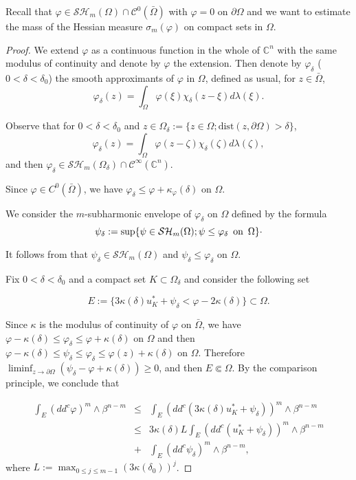 \documentclass[12pt]{amsart}
\theoremstyle{definition}
\numberwithin{theorem}{section}
\numberwithin{equation}{section}
\newcommand{\C}{\mathbb{C}}
\begin{document}
{ Recall that $\varphi \in \mathcal{SH}_m (\Omega)  \cap \mathcal{C}^0 (\bar{\Omega})$ with $\varphi = 0$ on $\partial \Omega$ and we want to estimate the mass of the Hessian measure $\sigma_m (\varphi)$ on compact sets in $\Omega$.
 \begin{proof} 
We extend $\varphi$ as a continuous function in the whole of $\C^n$ with the same modulus of continuity and denote by $\varphi$ the extension.
 Then denote by $\varphi_{\delta}$ ($0 < \delta < \delta_0$) the smooth approximants of $\varphi $ in $\Omega$, defined as usual, for $z \in \bar \Omega$, 
   $$
    \varphi_{\delta}(z)=  \int_{\Omega}\varphi(\xi)\chi_{\delta}(z-\xi) d\lambda(\xi).
    $$

 Observe that for $0 < \delta < \delta_0$ and $z\in\Omega_{\delta}  := \{z \in \Omega ; \mathrm{dist} (z, \partial \Omega) > \delta\}$, 
     $$
     \varphi_{\delta}(z)=  \int_{\Omega}\varphi(z - \zeta)\chi_{\delta}(\zeta) d\lambda(\zeta),
     $$
  and then $\varphi_\delta \in  \mathcal{SH}_m (\Omega_{\delta})\cap\mathcal{C}^{\infty}(\C^n)$.
 
 Since $\varphi \in C^{0} (\bar\Omega)$, we have $\varphi_\delta \leq \varphi + \kappa_{\varphi} (\delta)$ on $\Omega$. 


 We consider the $m$-subharmonic envelope of   $\varphi_\delta$ on  $\Omega$  defined by the formula 
 $$
 \psi_\delta := \sup \{\psi \in \mathcal{SH}_m (\Omega) ; \psi \leq \varphi_\delta \, \, \, \hbox{on} \, \, \,  \Omega \}\cdot 
 $$ 
 
 It follows from  \cite[Theorem 3.3]{BZ20}  that $\psi_\delta \in \mathcal{SH}_m (\Omega)$ and $\psi_\delta \leq \varphi_\delta$ on $\Omega$. 
  
 Fix $0 < \delta < \delta_0$ and a compact set $K \subset \Omega_\delta$ and consider the following set
 
 $$
 E :=\{3 \kappa (\delta)  u_K^*+ \psi_\delta<\varphi- 2 \kappa (\delta)\} \subset \Omega.
 $$

 
 Since $ \kappa$ is the modulus of continuity of $\varphi $ on $\bar \Omega$, we have  $\varphi -  \kappa (\delta) \leq \varphi_{\delta}  \leq \varphi + \kappa (\delta)$ on $\Omega$ and then   $\varphi -  \kappa (\delta) \leq \psi_\delta \leq  \varphi_{\delta}  \leq \varphi (z) + \kappa (\delta)$  on $\Omega$. 
Therefore  $\liminf_{z \to \partial \Omega} (\psi_\delta - \varphi + \kappa (\delta)) \geq 0$, and then $E \Subset \Omega$. By the comparison principle, we conclude that
 
\begin{eqnarray} \label{eq:fundmentalestimate}
 \int_{E}(dd^c\varphi)^m\wedge\beta^{n-m} & \leq & \int_{E}(dd^c(3 \kappa (\delta)  u_K^* + \psi_{\delta}))^m\wedge\beta^{n-m} \nonumber \\
 & \leq & 3 \kappa (\delta) L \int_{E}(dd^c(u_K^* + \psi_{\delta}))^m\wedge\beta^{n-m} \\
 &+&\int_{E}(dd^c\psi_{\delta})^m\wedge\beta^{n-m}, \nonumber
 \end{eqnarray}
 where $L := \max_{0 \leq j \leq m - 1} (3 \kappa (\delta_0))^j$.
 

\end{proof}}
\end{document}
